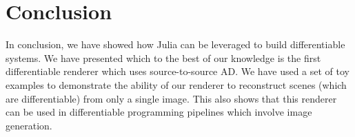 \documentclass{juliacon}
\begin{document}
\section{Conclusion}

In conclusion, we have showed how Julia can be leveraged to build differentiable systems. We have presented which to the best of our knowledge is the first differentiable renderer which uses source-to-source AD. We have used a set of toy examples to demonstrate the ability of our renderer to reconstruct scenes (which are differentiable) from only a single image. This also shows that this renderer can be used in differentiable programming pipelines which involve image generation.  



\end{document}
